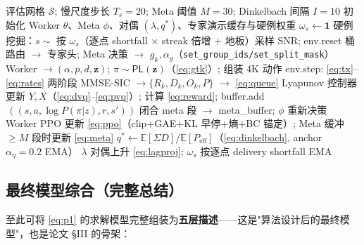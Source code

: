 \documentclass[UTF8,11pt,a4paper]{ctexart}
\theoremstyle{plain}
\theoremstyle{definition}
\theoremstyle{remark}
\newcommand{\E}{\mathbb{E}}
\newcommand{\vect}[1]{\mathbf{#1}}
\begin{document}
\begin{algorithm}[ht]
\caption{两级 POCMDP 在线训练（Worker PPO + Meta PPO + Dinkelbach/Lagrangian 外环 + 硬例挖掘）}
\label{alg:train}
\begin{algorithmic}[1]
\Require 评估网格 $\mathcal S$; 慢尺度步长 $T_s=20$; Meta 阈值 $M=30$; Dinkelbach 间隔 $I=10$
\State 初始化 Worker $\theta$、Meta $\phi$、对偶 $(\lambda,q^*)$、专家演示缓存与硬例权重 $\omega_s\leftarrow\mathbf 1$
  \State 硬例挖掘：$s{\sim}$ 按 $\omega_s$（逐点 shortfall $\times$ streak 倍增 $+$ 地板）采样 SNR; env.reset
  \State 桶路由 $\to$ 专家头; Meta 决策 $\to$ $g_k,\alpha_g$（\texttt{set\_group\_ids/set\_split\_mask}）
    \State Worker $\to(\alpha,p,d,\vect z)$; $\pi\sim\mathsf{PL}(\vect z)$（\eqref{eq:gtk}）; 组装 4K 动作
    \State env.step: \eqref{eq:tx}--\eqref{eq:rates} 两阶段 MMSE-SIC $\to\{R_k,D_k,O_k,P\}$ $\to$ \eqref{eq:queue}
    \State Lyapunov 控制器更新 $Y,X$（\eqref{eq:dvq}--\eqref{eq:pvq}）; 计算 \eqref{eq:reward}; buffer.add$\,((s,a,\log P(\pi|z),r,s'))$
     \State 闭合 meta 段 $\to$ meta\_buffer; $\phi$ 重新决策 \EndIf
  \EndFor
  \State Worker PPO 更新 \eqref{eq:ppo}（clip+GAE+KL 早停+熵+BC 锚定）; Meta 缓冲 $\ge M$ 段时更新 \eqref{eq:meta}
   \State $q^*\!\leftarrow\!\E[\Sigma D]/\E[P_{\mathrm{eff}}]$（\eqref{eq:dinkelbach}, anchor $\alpha_\eta{=}0.2$ EMA）\EndIf
  \State $\lambda$ 对偶上升 \eqref{eq:lagproj}; $\omega_s$ 按逐点 delivery shortfall EMA
\EndFor
\end{algorithmic}
\end{algorithm}

\subsection{最终模型综合（完整总结）} \label{sec:assembly}

至此可将 \eqref{eq:p1} 的求解模型完整组装为\textbf{五层描述}——这是"算法设计后的最终模型"，也是论文 \S III 的骨架：
\end{document}
